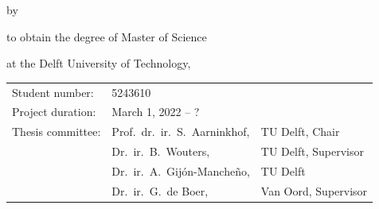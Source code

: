\begin{titlepage}


    \begin{center}


        {\makeatletter
            \largetitlestyle\fontsize{48}{94}\selectfont\@title
            \makeatother}

        {\makeatletter
            \ifx\@subtitle\undefined\else
                \bigskip
                {\tudsffamily\fontsize{22}{32}\selectfont\@subtitle}
            \fi
            \makeatother}

        \bigskip
        \bigskip

        by

        \bigskip
        \bigskip

        {\makeatletter
            \largetitlestyle\fontsize{26}{26}\selectfont\@author
            \makeatother}

        \bigskip
        \bigskip

        to obtain the degree of Master of Science

        at the Delft University of Technology,


        \vfill
        \begin{tabular}{lll}
            Student number:   & 5243610                                                       \\
            Project duration: & \multicolumn{2}{l}{March 1, 2022 -- ?}                        \\
            Thesis committee: & Prof.\ dr.\ ir.\ S.\ Aarninkhof,       & TU Delft, Chair      \\
                              & Dr.\ ir.\ B.\ Wouters,                 & TU Delft, Supervisor \\
                              & Dr.\ ir.\ A.\ Gijón-Mancheño,          & TU Delft             \\
                              & Dr.\ ir.\ G.\ de Boer,                 & Van Oord, Supervisor
        \end{tabular}


\end{center}
\end{titlepage}
